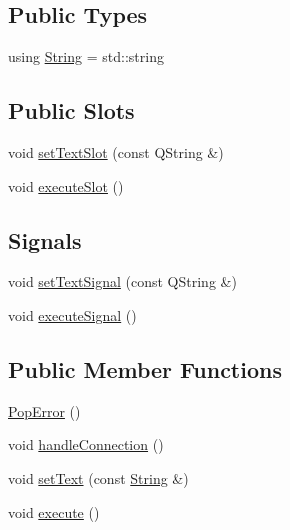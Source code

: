 \subsection*{Public Types}
\begin{DoxyCompactItemize}
\item 
using \hyperlink{classPopError_a10f9b6cbf4bae9b9dd5226950c1a36be}{String} = std\+::string
\end{DoxyCompactItemize}
\subsection*{Public Slots}
\begin{DoxyCompactItemize}
\item 
void \hyperlink{classPopError_ad4e97cc2e18d85d68a8e2eab8c6c6261}{set\+Text\+Slot} (const Q\+String \&)
\item 
void \hyperlink{classPopError_a083b9ed8c271233a26b0551bfb505393}{execute\+Slot} ()
\end{DoxyCompactItemize}
\subsection*{Signals}
\begin{DoxyCompactItemize}
\item 
void \hyperlink{classPopError_af60b7e6052b6acdb4fb9d3b1897beff3}{set\+Text\+Signal} (const Q\+String \&)
\item 
void \hyperlink{classPopError_a27399d28bccf522da4b51d5fbf230f23}{execute\+Signal} ()
\end{DoxyCompactItemize}
\subsection*{Public Member Functions}
\begin{DoxyCompactItemize}
\item 
\hyperlink{classPopError_af8c8d37fd7a48ccf8d546a2a5cd90570}{Pop\+Error} ()
\item 
void \hyperlink{classPopError_ae3536ead1943613df02fe7a3c1a04848}{handle\+Connection} ()
\item 
void \hyperlink{classPopError_a1cd7be40b9010ac9ef46f560dacc91b9}{set\+Text} (const \hyperlink{classPopError_a10f9b6cbf4bae9b9dd5226950c1a36be}{String} \&)
\item 
void \hyperlink{classPopError_a9a093bc81c3d1f2dccf37fa01186d9c9}{execute} ()
\end{DoxyCompactItemize}


